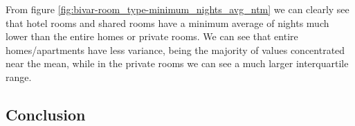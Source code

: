\pagebreak


From figure \cref{fig:bivar-room_type-minimum_nights_avg_ntm} we can clearly see
that hotel rooms and shared rooms have a minimum average of nights much lower
than the entire homes or private rooms.  We can see that entire homes/apartments
have less variance, being the majority of values concentrated near the mean,
while in the private rooms we can see a much larger interquartile range.

\subsection{Conclusion}%
\label{sub:data-conclusion} %


